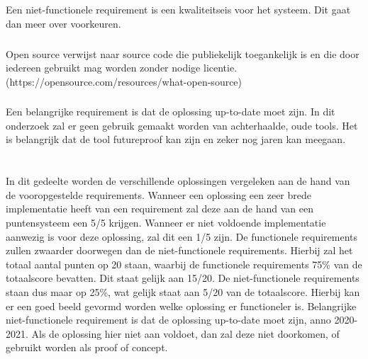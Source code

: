 \subsection{}
\label{subsec:Niet-functionele Requirements}
Een niet-functionele requirement is een kwaliteitseis voor het systeem. Dit gaat dan meer over voorkeuren.

\subsubsection{}
\label{subsubsec:Open source}
Open source verwijst naar source code die publiekelijk toegankelijk is en die door iedereen gebruikt mag worden zonder nodige licentie. (https://opensource.com/resources/what-open-source)

\subsubsection{}
\label{subsubsecAnno 2020-2021}
Een belangrijke requirement is dat de oplossing up-to-date moet zijn. In dit onderzoek zal er geen gebruik gemaakt worden van achterhaalde, oude tools. Het is belangrijk dat de tool futureproof kan zijn en zeker nog jaren kan meegaan.




\section{}
\label{sec:Hoe beantwoorden de verschillende oplossingen aan de bovenstaande schifting}

In dit gedeelte worden de verschillende oplossingen vergeleken aan de hand van de vooropgestelde requirements. Wanneer een oplossing een zeer brede implementatie heeft van een requirement zal deze aan de hand van een puntensysteem een 5/5 krijgen. Wanneer er niet voldoende implementatie aanwezig is voor deze oplossing, zal dit een 1/5 zijn. De functionele requirements zullen zwaarder doorwegen dan de niet-functionele requirements. Hierbij zal het totaal aantal punten op 20 staan, waarbij de functionele requirements 75\% van de totaalscore bevatten. Dit staat gelijk aan 15/20. De niet-functionele requirements staan dus maar op 25\%, wat gelijk staat aan 5/20 van de totaalscore. Hierbij kan er een goed beeld gevormd worden welke oplossing er functioneler is. Belangrijke niet-functionele requirement is dat de oplossing up-to-date moet zijn, anno 2020-2021. Als de oplossing hier niet aan voldoet, dan zal deze niet doorkomen, of gebruikt worden als proof of concept.

